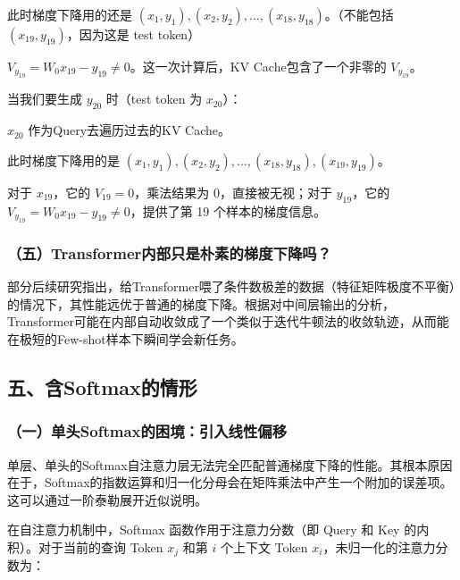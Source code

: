此时梯度下降用的还是 \((x_1,y_1),(x_2,y_2),\ldots,(x_{18},y_{18})\)。（不能包括 \((x_{19},y_{19})\)，因为这是 test token）

\(V_{y_{19}}=W_0x_{19}-y_{19}\ne 0\)。这一次计算后，KV Cache包含了一个非零的 \(V_{y_{19}}\)。

当我们要生成 \(y_{20}\) 时（test token 为 \(x_{20}\)）：

\(x_{20}\) 作为Query去遍历过去的KV Cache。

此时梯度下降用的是 \((x_1,y_1),(x_2,y_2),\ldots,(x_{18},y_{18}),(x_{19},y_{19})\)。

对于 \(x_{19}\)，它的 \(V_{19}=0\)，乘法结果为 \(0\)，直接被无视；对于 \(y_{19}\)，它的 \(V_{y_{19}}=W_0x_{19}-y_{19}\ne 0\)，提供了第 19 个样本的梯度信息。

\hypertarget{ux4e94transformerux5185ux90e8ux53eaux662fux6734ux7d20ux7684ux68afux5ea6ux4e0bux964dux5417}{%
\subsubsection{（五）Transformer内部只是朴素的梯度下降吗？}\label{ux4e94transformerux5185ux90e8ux53eaux662fux6734ux7d20ux7684ux68afux5ea6ux4e0bux964dux5417}}

部分后续研究指出，给Transformer喂了条件数极差的数据（特征矩阵极度不平衡）的情况下，其性能远优于普通的梯度下降。根据对中间层输出的分析，Transformer可能在内部自动收敛成了一个类似于迭代牛顿法的收敛轨迹，从而能在极短的Few-shot样本下瞬间学会新任务。

\hypertarget{ux4e94ux542bsoftmaxux7684ux60c5ux5f62}{%
\subsection{五、含Softmax的情形}\label{ux4e94ux542bsoftmaxux7684ux60c5ux5f62}}

\hypertarget{ux4e00ux5355ux5934softmaxux7684ux56f0ux5883ux5f15ux5165ux7ebfux6027ux504fux79fb}{%
\subsubsection{（一）单头Softmax的困境：引入线性偏移}\label{ux4e00ux5355ux5934softmaxux7684ux56f0ux5883ux5f15ux5165ux7ebfux6027ux504fux79fb}}

单层、单头的Softmax自注意力层无法完全匹配普通梯度下降的性能。其根本原因在于，Softmax的指数运算和归一化分母会在矩阵乘法中产生一个附加的误差项。这可以通过一阶泰勒展开近似说明。

在自注意力机制中，Softmax 函数作用于注意力分数（即 Query 和 Key 的内积）。对于当前的查询 Token \(x_j\) 和第 \(i\) 个上下文 Token \(x_i\)，未归一化的注意力分数为：

